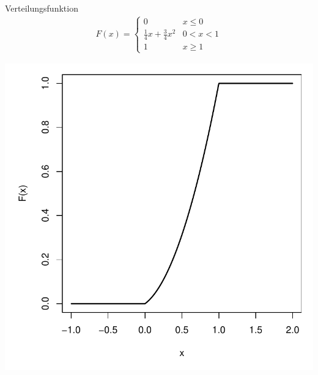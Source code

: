 \documentclass[t,11pt]{beamer}
\begin{document}
\begin{frame}
	\begin{block}{Verteilungsfunktion}
		\vspace{-0.5cm}
		\begin{align*}
		F(x)=\begin{cases}
		0 & x\leq 0 \\
		\frac{1}{4}x +\frac{3}{4}x^2  & 0<x<1\\
		1 & x \geq 1
		\end{cases}
		\end{align*}
	\end{block}
	\begin{center}
		\includegraphics[scale=0.4]{Fx.pdf}
	\end{center}
\end{frame}
\end{document}
